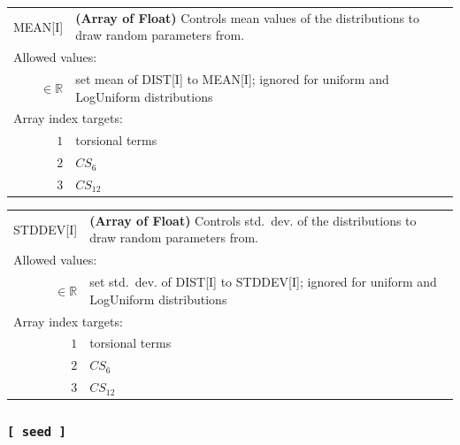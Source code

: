 \documentclass[10pt,a4paper,openany]{memoir}
\numberwithin{equation}{section}
\begin{document}
{
\begin{tabular}{r@{ : }l}
\label{descr:mean}
      MEAN[I]&\textbf{(Array of Float)} Controls mean values of the distributions to draw random parameters from.                            \\ 
\multicolumn{2}{l}{Allowed values:} \\ 
\(\in\mathbb{R}\)&set mean of DIST[I] to MEAN[I]; ignored for uniform and LogUniform distributions                                                                       \\ 
\multicolumn{2}{l}{Array index targets:} \\ 
     \(1\)&torsional terms                                                                                      \\ 
     \(2\)&$CS_6$                                                                                               \\ 
     \(3\)&$CS_{12}$                                                                                            \\ 
\end{tabular}
\vspace{1ex}
}

{
\begin{tabular}{r@{ : }l}
\label{descr:stddev}
    STDDEV[I]&\textbf{(Array of Float)} Controls std.~dev. of the distributions to draw random parameters from.                              \\ 
\multicolumn{2}{l}{Allowed values:} \\ 
\(\in\mathbb{R}\)&set std.~dev. of DIST[I] to STDDEV[I]; ignored for uniform and LogUniform distributions                                                       \\ 
\multicolumn{2}{l}{Array index targets:} \\ 
     \(1\)&torsional terms                                                                                      \\ 
     \(2\)&$CS_6$                                                                                               \\ 
     \(3\)&$CS_{12}$                                                                                            \\ 
\end{tabular}
\vspace{1ex}
}

\subsubsection{\texttt{[~seed~]}}
\label{sec:inp-seed}
\end{document}
